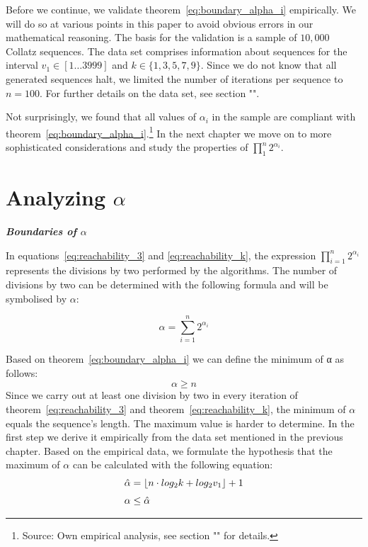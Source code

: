 \documentclass{SciPress_2015}
\renewcommand{\subsection}[1]{\textit{\textbf{#1}}}
\begin{document}
Before we continue, we validate theorem~\ref{eq:boundary_alpha_i} empirically. We will do so at various points in this paper to avoid obvious errors in our mathematical reasoning. The basis for the validation is a sample of $10,000$ Collatz sequences. The data set comprises information about sequences for the interval $v_1\in[1\ldots3999]$ and $k\in\{1,3,5,7,9\}$. Since we do not know that all generated sequences halt, we limited the number of iterations per sequence to $n=100$. For further details on the data set, see section "".

Not surprisingly, we found that all values of $\alpha_i$ in the sample are compliant with theorem~\ref{eq:boundary_alpha_i}.\footnote{Source: Own empirical analysis, see section "" for details.} In the next chapter we move on to more sophisticated considerations and study the properties of $\prod_{1}^{n}2^{\alpha_i}$.

\section{Analyzing \boldmath$\alpha$}
\label{sec:analysing_alpha}
\subsection{Boundaries of \boldmath$\alpha$}
\par\noindent
In equations~\ref{eq:reachability_3} and \ref{eq:reachability_k}, the expression $\prod_{i=1}^{n}2^{\alpha_i}$  represents the divisions by two performed by the algorithms. The number of divisions by two can be determined with the following formula and will be symbolised by $\alpha$:

\begin{equation}
\label{eq:sum_alpha}
\alpha=\sum_{i=1}^{n}2^{\alpha_i}
\end{equation}

\newpage
\par\noindent
Based on theorem~\ref{eq:boundary_alpha_i} we can define the minimum of α as follows:
\[
\alpha\ge n
\]
Since we carry out at least one division by two in every iteration of theorem~\ref{eq:reachability_3} and theorem~\ref{eq:reachability_k}, the minimum of $\alpha$ equals the sequence's length. The maximum value is harder to determine. In the first step we derive it empirically from the data set mentioned in the previous chapter. Based on the empirical data, we formulate the hypothesis that the maximum of $\alpha$ can be calculated with the following equation:
\begin{equation}
\label{eq:max_alpha}
\begin{array}{l}
\hat\alpha=\lfloor n\cdot log_2k+log_2v_1\rfloor+1\\[\medskipamount]
\alpha\le\hat\alpha
\end{array}	
\end{equation}
\end{document}
